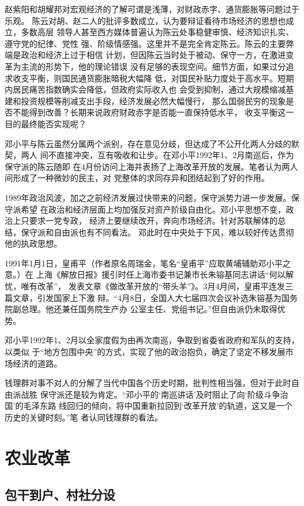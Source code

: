 赵紫阳和胡耀邦对宏观经济的了解可谓是浅薄，对财政赤字、通货膨胀等问题过于乐观。
陈云对胡、赵二人的批评多数成立，认为要辩证看待市场经济的思想也成立，多数高层
领导人甚至西方媒体普遍认为陈云处事稳健审慎、经济知识扎实、遵守党的纪律、党性
强、阶级情感强。这里并不是完全肯定陈云。陈云的主要弊端是政治和经济上过于相信
计划，但因陈云当时处于被动、保守一方，在激进变革为主流的形势下，他的理论错误
没有足够的表现空间。细节方面，如果过分追求收支平衡，则国民通货膨胀暗税大幅降
低，对国民补贴力度处于高水平。短期内居民痛苦指数确实会降低，但政府实际收入也
会受到抑制，通过大规模缩减基建和投资规模等削减支出手段，经济发展必然大幅慢行，
那么国弱民穷的现象是否不能得到改善？长期来说政府财政赤字是否能一直保持低水平，
收支平衡这一目的最终能否实现呢？

邓小平与陈云虽然分属两个派别，存在意见分歧，但达成了不公开化两人分歧的默契，两人
间不直接冲突，互有吸收和让步。在邓小平1992年1、2月南巡后，作为保守派的陈云随即
在4月份访问上海并表扬了上海改革开放的发展。笔者认为两人间形成了一种微妙的民主，对
党整体的求同存异和团结起到了好的作用。

1989年政治风波，加之之前经济发展过快带来的问题，保守派势力进一步发展。保守派希望
在政治和经济层面上均加强反对资产阶级自由化。邓小平思想不变，政治上只要求一党专政，
经济上要继续改开，奔向市场经济。针对苏联解体的总结，保守派和自由派也有不同看法。
邓此时在中央处于下风，难以较好传达贯彻他的执政思想。

1991年1月1日，皇甫平（作者原名周瑞金，笔名“皇甫平”应取黄埔辅助邓小平之意。）在
上海《解放日报》援引时任上海市委书记兼市长朱镕基同志讲话“何以解忧，唯有改革”，
发表文章《做改革开放的“带头羊”》。3月4月间，皇甫平连发三篇文章，引发国家上下激
辩。“4月8日，全国人大七届四次会议补选朱镕基为国务院副总理。他还兼任国务院生产办
公室主任、党组书记。”但自由派仍未取得优势。

邓小平1992年1、2月以全家度假为由再次南巡，争取到省委省政府和军队的支持，以类似
于“地方包围中央”的方式，实现了他的政治抱负，确定了坚定不移发展市场经济的道路。

钱理群对事不对人的分解了当代中国各个历史时期，批判性相当强，但对于此时自由派战胜
保守派还是较为肯定。“邓小平的‘南巡讲话’及时阻止了向‘阶级斗争治国’的毛泽东路
线回归的倾向，将中国重新拉回到‘改革开放’的轨道，这又是一个历史的关键时刻。”笔
者认同钱理群的看法。

\section{农业改革}

\subsection{包干到户、村社分设}

